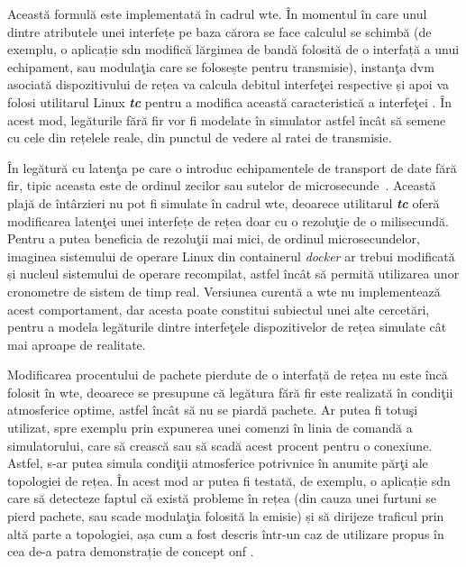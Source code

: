 Această formulă este implementată în cadrul \gls{wte}. În momentul în care unul dintre atributele unei interfețe pe baza cărora se face calculul se schimbă (de exemplu, o aplicație \gls{sdn} modifică lărgimea de bandă folosită de o interfață a unui echipament, sau modulaţia care se folosește pentru transmisie), instanţa \gls{dvm} asociată dispozitivului de rețea va calcula debitul interfeţei respective și apoi va folosi utilitarul Linux \textit{\textbf{tc}} pentru a modifica această caracteristică a interfeţei \cite{tcmanlinux}. În acest mod, legăturile fără fir vor fi modelate în simulator astfel încât să semene cu cele din rețelele reale, din punctul de vedere al ratei de transmisie.

În legătură cu latenţa pe care o introduc echipamentele de transport de date fără fir, tipic aceasta este de ordinul zecilor sau sutelor de microsecunde~\cite{kizer2013digital}. Această plajă de întârzieri nu pot fi simulate în cadrul \gls{wte}, deoarece utilitarul \textit{\textbf{tc}} oferă modificarea latenţei unei interfețe de rețea doar cu o rezoluţie de o milisecundă. Pentru a putea beneficia de rezoluţii mai mici, de ordinul microsecundelor, imaginea sistemului de operare Linux din containerul \textit{docker} ar trebui modificată și nucleul sistemului de operare recompilat, astfel încât să permită utilizarea unor cronometre de sistem de timp real. Versiunea curentă a \gls{wte} nu implementează acest comportament, dar acesta poate constitui subiectul unei alte cercetări, pentru a modela legăturile dintre interfeţele dispozitivelor de rețea simulate cât mai aproape de realitate.

Modificarea procentului de pachete pierdute de o interfață de rețea nu este încă folosit în \gls{wte}, deoarece se presupune că legătura fără fir este realizată în condiţii atmosferice optime, astfel încât să nu se piardă pachete. Ar putea fi totuşi utilizat, spre exemplu prin expunerea unei comenzi în linia de comandă a simulatorului, care să crească sau să scadă acest procent pentru o conexiune. Astfel, s-ar putea simula condiţii atmosferice potrivnice în anumite părţi ale topologiei de rețea. În acest mod ar putea fi testată, de exemplu, o aplicație \gls{sdn} care să detecteze faptul că există probleme în rețea (din cauza unei furtuni se pierd pachete, sau scade modulaţia folosită la emisie) și să dirijeze traficul prin altă parte a topologiei, așa cum a fost descris într-un caz de utilizare propus în cea de-a patra demonstrație de concept \gls{onf} \cite{onf2017_poc4}.

